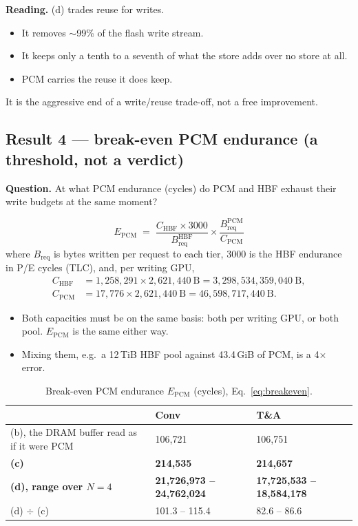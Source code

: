 \documentclass[11pt,a4paper]{article}
\newcommand{\hd}[1]{\textbf{#1}}
\begin{document}
\textbf{Reading.} (d) trades reuse for writes.
\begin{itemize}
  \item It removes $\sim$99\% of the flash write stream.
  \item It keeps only a tenth to a seventh of what the store adds over no
    store at all.
  \item PCM carries the reuse it does keep.
\end{itemize}
It is the aggressive end of a write/reuse trade-off, not a free improvement.

\subsection{Result 4 --- break-even PCM endurance (a threshold, not a verdict)}

\textbf{Question.} At what PCM endurance (cycles) do PCM and HBF exhaust their
write budgets at the same moment?

\begin{equation}
  E_\text{PCM} \;=\;
  \frac{C_\text{HBF} \times 3000}{B^\text{HBF}_\text{req}}
  \times
  \frac{B^\text{PCM}_\text{req}}{C_\text{PCM}}
  \label{eq:breakeven}
\end{equation}
where $B_\text{req}$ is bytes written per request to each tier, 3000 is the
HBF endurance in P/E cycles (TLC), and, per writing GPU,
\begin{align*}
  C_\text{HBF} &= 1{,}258{,}291 \times 2{,}621{,}440\ \text{B} = 3{,}298{,}534{,}359{,}040\ \text{B},\\
  C_\text{PCM} &= 17{,}776 \times 2{,}621{,}440\ \text{B} = 46{,}598{,}717{,}440\ \text{B}.
\end{align*}

\begin{itemize}
  \item Both capacities must be on the same basis: both per writing GPU, or
    both pool. $E_\text{PCM}$ is the same either way.
  \item Mixing them, e.g.\ a 12\,TiB HBF pool against 43.4\,GiB of PCM, is a
    4$\times$ error.
\end{itemize}

\begin{xltabular}{\linewidth}{@{}Y{1.4} Y{0.8} Y{0.8}@{}}
\caption{Break-even PCM endurance $E_\text{PCM}$ (cycles), Eq.~\eqref{eq:breakeven}.}\label{tab:r4}\\
\toprule
 & \hd{Conv} & \hd{T\&A} \\
\midrule
(b), the DRAM buffer read as if it were PCM & 106,721 & 106,751 \\
\textbf{(c)} & \textbf{214,535} & \textbf{214,657} \\
\textbf{(d), range over $N = 4$} & \textbf{21,726,973 -- 24,762,024} & \textbf{17,725,533 -- 18,584,178} \\
(d) $\div$ (c) & 101.3 -- 115.4 & 82.6 -- 86.6 \\
\bottomrule
\end{xltabular}
\end{document}
